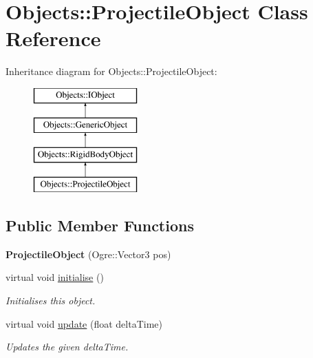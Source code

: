 \hypertarget{class_objects_1_1_projectile_object}{\section{Objects\-:\-:Projectile\-Object Class Reference}
\label{class_objects_1_1_projectile_object}
}
Inheritance diagram for Objects\-:\-:Projectile\-Object\-:\begin{figure}[H]
\begin{center}
\leavevmode
\includegraphics[height=4.000000cm]{class_objects_1_1_projectile_object}
\end{center}
\end{figure}
\subsection*{Public Member Functions}
\begin{DoxyCompactItemize}
\item 
\hypertarget{class_objects_1_1_projectile_object_aa92f0b199905a0a580788764cddf4216}{{\bfseries Projectile\-Object} (Ogre\-::\-Vector3 pos)}\label{class_objects_1_1_projectile_object_aa92f0b199905a0a580788764cddf4216}

\item 
\hypertarget{class_objects_1_1_projectile_object_a8d8fe24f249a79da5970a3daa2cbdf9d}{virtual void \hyperlink{class_objects_1_1_projectile_object_a8d8fe24f249a79da5970a3daa2cbdf9d}{initialise} ()}\label{class_objects_1_1_projectile_object_a8d8fe24f249a79da5970a3daa2cbdf9d}

\begin{DoxyCompactList}\small\item\em Initialises this object. \end{DoxyCompactList}\item 
virtual void \hyperlink{class_objects_1_1_projectile_object_ae8cb3b7f7a9f5b921b043a58e9e355dc}{update} (float delta\-Time)
\begin{DoxyCompactList}\small\item\em Updates the given delta\-Time. \end{DoxyCompactList}\end{DoxyCompactItemize}
